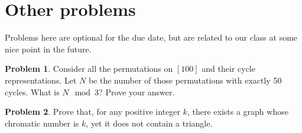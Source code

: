 \documentclass[12pt]{article}
\theoremstyle{definition}
\newtheorem{hw}{Problem}
\begin{document}
\section{Other problems}

Problems here are optional for the due date, but are related to our class at some nice point in the future.

\begin{hw}
Consider all the permutations on $[100]$ and their cycle
representations.
Let $N$ be the number of those permutations with
exactly 50 cycles. What is $N \mod 3$? Prove your answer.
\end{hw}

\begin{hw}
Prove that, for any positive integer $k$, there exists
a graph whose chromatic number is $k$, yet it does not
contain a triangle.
\end{hw}
\end{document}
